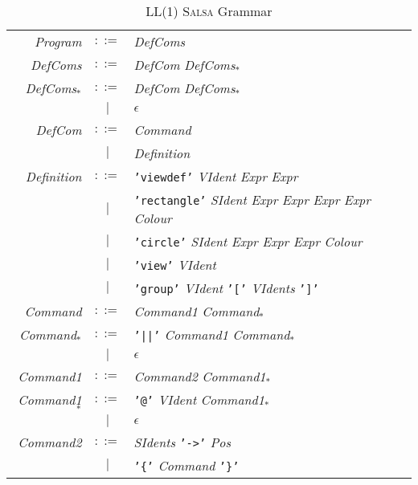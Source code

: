 \documentclass[
paper=a4,
oneside,
fontsize=11pt,
numbers=noenddot,
headinclude=false, %
footinclude=false, %
fleqn,             %
DIV=8
]{scrartcl}
\begin{document}
\begin{table}[h]
  \centering\regnum
  \caption{{\regnum LL(1)} {\scshape Salsa} Grammar}\label{grammar}
  \begin{tabularx}{\textwidth}{rcX} \toprule
    {\em Program}    & $::=$ & {\em DefComs}\\
    {\em DefComs}    & $::=$ & {\em DefCom} {\em DefComs$_{*}$}\\
    {\em DefComs$_{*}$}   & $::=$ & {\em DefCom} {\em DefComs$_{*}$}\\
               & $|$   & $\epsilon$\\
    {\em DefCom}     & $::=$ & {\em Command}\\
               & $|$   & {\em Definition}\\
    {\em Definition} & $::=$ & {\tt 'viewdef'} {\em VIdent} {\em Expr} {\em Expr}\\
               & $|$   & {\tt 'rectangle'} {\em SIdent} {\em Expr} {\em Expr} {\em Expr} {\em Expr} {\em Colour}\\
               & $|$   & {\tt 'circle'} {\em SIdent} {\em Expr} {\em Expr} {\em Expr} {\em Colour}\\
               & $|$   & {\tt 'view'} {\em VIdent}\\
               & $|$   & {\tt 'group'} {\em VIdent} {\tt '['} {\em VIdents} {\tt ']'}\\
    {\em Command}    & $::=$ & {\em Command1} {\em Command$_{*}$}\\
    {\em Command$_{*}$}    & $::=$ & {\tt '||'} {\em Command1} {\em Command$_{*}$}\\
               & $|$ & $\epsilon$ \\
    {\em Command1}    & $::=$ & {\em Command2} {\em Command1$_{*}$}\\
    {\em Command1$_{*}$}    & $::=$ & {\tt '@'} {\em VIdent} {\em Command1$_{*}$}\\
               & $|$ & $\epsilon$ \\
    {\em Command2}    & $::=$ & {\em SIdents} {\tt '->'} {\em Pos}\\
               & $|$   & {\tt '\{'} {\em Command} {\tt '\}'}\\


\end{tabularx}
\end{table}
\end{document}
